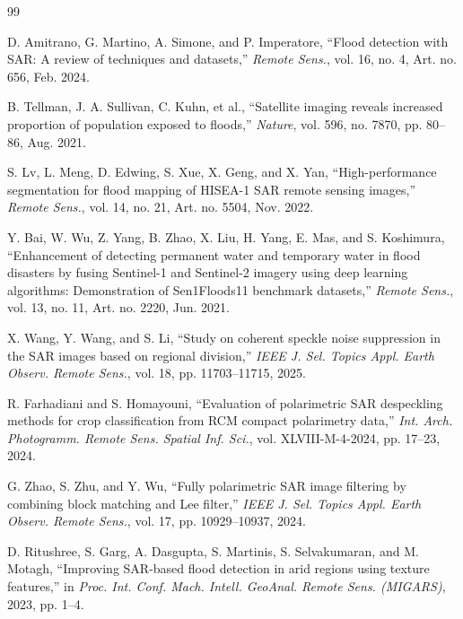 \documentclass[lettersize,journal]{IEEEtran}
\begin{document}
\begin{thebibliography}{99}

D. Amitrano, G. Martino, A. Simone, and P. Imperatore, ``Flood detection with SAR: A review of techniques and datasets,'' \textit{Remote Sens.}, vol. 16, no. 4, Art. no. 656, Feb. 2024.

B. Tellman, J. A. Sullivan, C. Kuhn, et al., ``Satellite imaging reveals increased proportion of population exposed to floods,'' \textit{Nature}, vol. 596, no. 7870, pp. 80--86, Aug. 2021.

S. Lv, L. Meng, D. Edwing, S. Xue, X. Geng, and X. Yan, ``High-performance segmentation for flood mapping of HISEA-1 SAR remote sensing images,'' \textit{Remote Sens.}, vol. 14, no. 21, Art. no. 5504, Nov. 2022.

Y. Bai, W. Wu, Z. Yang, B. Zhao, X. Liu, H. Yang, E. Mas, and S. Koshimura, ``Enhancement of detecting permanent water and temporary water in flood disasters by fusing Sentinel-1 and Sentinel-2 imagery using deep learning algorithms: Demonstration of Sen1Floods11 benchmark datasets,'' \textit{Remote Sens.}, vol. 13, no. 11, Art. no. 2220, Jun. 2021.

X. Wang, Y. Wang, and S. Li, ``Study on coherent speckle noise suppression in the SAR images based on regional division,'' \textit{IEEE J. Sel. Topics Appl. Earth Observ. Remote Sens.}, vol. 18, pp. 11703--11715, 2025.

R. Farhadiani and S. Homayouni, ``Evaluation of polarimetric SAR despeckling methods for crop classification from RCM compact polarimetry data,'' \textit{Int. Arch. Photogramm. Remote Sens. Spatial Inf. Sci.}, vol. XLVIII-M-4-2024, pp. 17--23, 2024.

G. Zhao, S. Zhu, and Y. Wu, ``Fully polarimetric SAR image filtering by combining block matching and Lee filter,'' \textit{IEEE J. Sel. Topics Appl. Earth Observ. Remote Sens.}, vol. 17, pp. 10929--10937, 2024.

D. Ritushree, S. Garg, A. Dasgupta, S. Martinis, S. Selvakumaran, and M. Motagh, ``Improving SAR-based flood detection in arid regions using texture features,'' in \textit{Proc. Int. Conf. Mach. Intell. GeoAnal. Remote Sens. (MIGARS)}, 2023, pp. 1--4.


\end{thebibliography}
\end{document}
